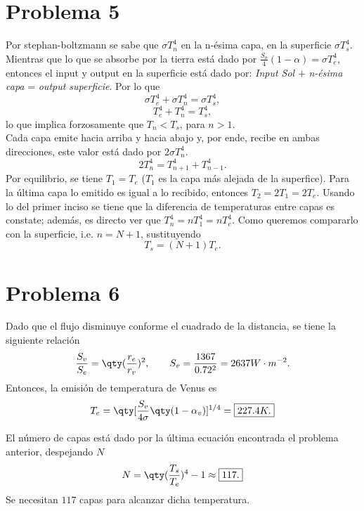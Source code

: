 \vspace{0.5cm}


\section*{Problema 5}
Por stephan-boltzmann se sabe que $\sigma T_n ^4$ en la n-ésima capa, en la superficie $\sigma T_s ^4$. Mientras que lo que se absorbe por la tierra está dado por $\frac{S_o}{4} (1 - \alpha) = \sigma T_e ^4$, entonces el input y output en la superficie está dado por: \textit{Input Sol} $+$ \textit{n-ésima capa} = \textit{output superficie}. Por lo que
	$$ \sigma T_e ^4 + \sigma T_n ^4 = \sigma T_s ^4, $$
	$$ T_e ^4 + T_n ^4 = T_s ^4, $$
lo que implica forzosamente que $\boxed{T_n < T_s}$, para $n > 1$. \\

Cada capa emite hacia arriba y hacia abajo y, por ende, recibe en ambas direcciones, este valor está dado por $2\sigma T_n ^4$. 
	$$ 2T_n ^4 = T_{n + 1} ^4 + T_{n - 1} ^4. $$
Por equilibrio, se tiene $T_1 = T_e$ ($T_1$ es la capa más alejada de la superfice). Para la última capa lo emitido es igual a lo recibido, entonces $T_2 = 2T_1 = 2T_e$. Usando lo del primer inciso se tiene que la diferencia de temperaturas entre capas es constate; además, es directo ver que $T_n ^4 = nT_1 ^4 = nT_e ^4$. Como queremos compararlo con la superficie, i.e. $n = N + 1$, sustituyendo
	$$ \boxed{T_s = (N + 1) T_e .} $$
	
	
\section*{Problema 6}
Dado que el flujo disminuye conforme el cuadrado de la distancia, se tiene la siguiente relación
	$$ \frac{S_v}{S_e} = \qty(\frac{r_e}{r_v})^2, \qquad S_v = \frac{1367}{0.72^2} = 2637 W\cdot m^{-2}. $$
Entonces, la emisión de temperatura de Venus es
	$$ T_e = \qty[\frac{S_v}{4\sigma} \qty(1 - \alpha _v)]^{1/4} = \boxed{227.4K.} $$
	
El número de capas está dado por la última ecuación encontrada el problema anterior, despejando $N$
	$$ N = \qty(\frac{T_s}{T_e})^4 - 1 \approx \boxed{117.} $$
Se necesitan $117$ capas para alcanzar dicha temperatura.


























